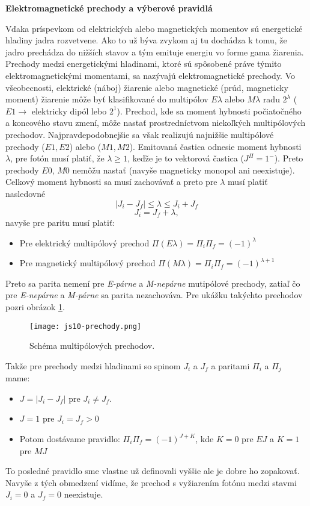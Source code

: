 \documentclass[../../main.tex]{subfiles}
\begin{document}
\textbf{Elektromagnetické prechody a výberové pravidlá}\par
Vďaka príspevkom od elektrických alebo magnetických momentov sú energetické hladiny jadra rozvetvene. Ako to už býva zvykom aj tu dochádza k tomu, že jadro prechádza do nižších stavov a tým emituje energiu vo forme gama žiarenia. Prechody medzi energetickými hladinami, ktoré sú spôsobené práve týmito elektromagnetickými momentami, sa nazývajú elektromagnetické prechody. Vo všeobecnosti, elektrické (náboj)
žiarenie alebo magnetické (prúd, magneticky moment) žiarenie môže byť klasifikované do multipólov $E\lambda$ alebo $M\lambda$ radu $2^{\lambda}$ ($E1\rightarrow$ elektricky dipól lebo $2^1$). Prechod, kde sa moment hybnosti počiatočného a koncového stavu zmení, môže nastať prostredníctvom niekoľkých multipólových prechodov. Najpravdepodobnejšie sa však realizujú najnižšie multipólové prechody ($E1,E2$) alebo ($M1,M2$). Emitovaná častica odnesie moment hybnosti $\lambda$, pre fotón musí platiť, že $\lambda\geq1$, keďže je to vektorová častica ($J^{\Pi}=1^{-}$). Preto prechody $E0$, $M0$ nemôžu nastať (navyše magneticky monopol ani neexistuje). Celkový moment hybnosti sa musí zachovávať a preto pre $\lambda$ musí platiť nasledovné
$$ \lvert J_i-J_f \rvert \leq \lambda \leq J_i+J_f $$
$$ J_i=J_f+\lambda,$$
navyše pre paritu musí platiť:
\begin{itemize}
	\item Pre elektrický multipólový prechod $\Pi(E\lambda)=\Pi_i\Pi_f=(-1)^{\lambda}$
	\item Pre magnetický multipólový prechod $\Pi(M\lambda)=\Pi_i\Pi_f=(-1)^{\lambda+1}$
\end{itemize}
Preto sa parita nemení pre \textit{E-párne} a \textit{M-nepárne} mutipólové prechody, zatiaľ čo pre \textit{E-nepárne} a \textit{M-párne} sa parita nezachováva. Pre ukážku takýchto prechodov pozri obrázok \ref{js10:prechody}.
\begin{figure}[!h]
\centerline{\texttt{[image: js10-prechody.png]}}
\caption{Schéma multipólových prechodov.}
\label{js10:prechody}
\end{figure}
\newline
Takže pre prechody medzi hladinami so spinom $J_i$ a $J_f$ a paritami $\Pi_i$ a $\Pi_j$ mame:
\begin{itemize}
	\item $J=\lvert J_i-J_f \rvert$ pre $J_i \neq J_f$.
	\item $J=1$ pre $J_i=J_f >0$
	\item Potom dostávame pravidlo: $\Pi_i\Pi_f=(-1)^{J+K}$, kde $K=0$ pre $EJ$ a $K=1$ pre $MJ$
\end{itemize}
To posledné pravidlo sme vlastne už definovali vyššie ale je dobre ho zopakovať. Navyše z tých obmedzení vidíme, že prechod s vyžiarením fotónu medzi stavmi $J_i=0$ a $J_f=0$ neexistuje.
\end{document}

